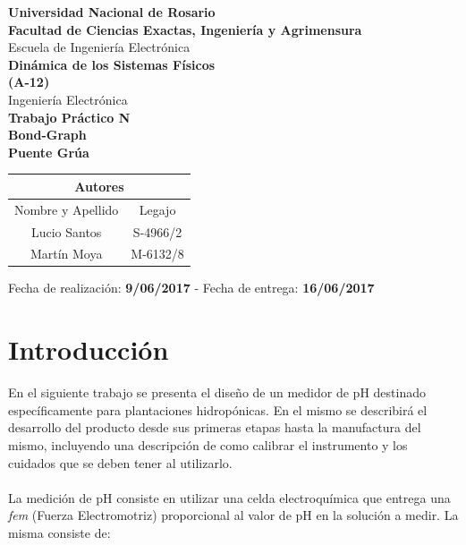 \documentclass[10pt,a4paper]{article}
\begin{document}
\begin{titlepage}
\begin{center}
 \large{ \textbf{Universidad Nacional de Rosario}} \\[5mm]
 \textbf{Facultad de Ciencias Exactas, Ingeniería y Agrimensura} \\[5mm]
 Escuela de Ingeniería Electrónica \\[20mm]
 \Large {\textbf{Dinámica de los Sistemas Físicos \\(A-12)}}\\[1.5mm]
 \small {Ingeniería Electrónica} \\[20mm]
 \Large {\textbf{Trabajo Práctico N}} \\[5mm]
 \LARGE{ \textbf{Bond-Graph \\ Puente Grúa}} \\[15mm]

\end{center}
\vspace{10pt}
	
\begin{center}
\begin{tabular}{|c|c|}
\hline 
\multicolumn{2}{|c|}{Autores} \\ 
\hline 
Nombre y Apellido & Legajo \\ 
\hline 
Lucio Santos  & S-4966/2 \\
\hline 
Martín Moya & M-6132/8 \\  
\hline 
\end{tabular}
\end{center}
\vfill
\begin{center}
Fecha de realización: \textbf{9/06/2017} - Fecha de entrega: \textbf{16/06/2017}
\end{center}

\end{titlepage}

\tableofcontents

\clearpage

\section{Introducción}

En el siguiente trabajo se presenta el diseño de un medidor de pH destinado específicamente para plantaciones hidropónicas. En el mismo se describirá el desarrollo del producto desde sus primeras etapas hasta la manufactura del mismo, incluyendo una descripción de como calibrar el instrumento y los cuidados que se deben tener al utilizarlo.\\
\\
La medición de pH consiste en utilizar una celda electroquímica que entrega una \emph{fem} (Fuerza Electromotriz) proporcional al valor de pH en la solución a medir. La misma consiste de:
\end{document}
